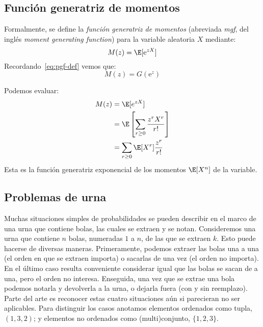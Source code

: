 \subsection{Función generatriz de momentos}
\label{sec:generatriz-momentos}

  Formalmente,
  se define la \emph{función generatriz de momentos}%
  (abreviada \emph{mgf},
   del inglés \emph{\foreignlanguage{english}{moment generating function}})
  para la variable aleatoria \(X\)
  mediante:
  \begin{equation}
    \label{eq:mgf-def}
    M(z)
      = \E[\mathrm{e}^{z X}]
  \end{equation}
  Recordando~\eqref{eq:pgf-def} vemos que:
  \begin{equation}
    \label{eq:mgf-pgf}
    M(z)
      = G(\mathrm{e}^z)
  \end{equation}

  Podemos evaluar:
  \begin{align}
    M(z)
      &= \E[e^{z X}] \notag \\
      &= \E\left[ \sum_{r \ge 0} \frac{z^r X^r}{r!} \right] \notag \\
      &= \sum_{r \ge 0} \E[X^r] \frac{z^r}{r!}
	   \label{eq:mgf-moments}
  \end{align}
  Esta es la función generatriz exponencial
  de los momentos \(\E[X^n]\) de la variable.

\subsection{Problemas de urna}
\label{sec:urn-problems}

  Muchas situaciones simples de probabilidades se pueden describir
  en el marco de una urna que contiene bolas,
  las cuales se extraen y se notan.
  Consideremos una urna que contiene \(n\) bolas,
  numeradas \(1\) a \(n\),
  de las que se extraen \(k\).
  Esto puede hacerse de diversas maneras.
  Primeramente,
  podemos extraer las bolas una a una
  (el orden en que se extraen importa)
  o sacarlas de una vez
  (el orden no importa).
  En el último caso
  resulta conveniente
  considerar igual que las bolas se sacan de a una,
  pero el orden no interesa.
  Enseguida,
  una vez que se extrae una bola podemos notarla
  y devolverla a la urna,
  o dejarla fuera
  (con y sin reemplazo).
  Parte del arte es reconocer estas cuatro situaciones
  aún si parecieran no ser aplicables.
  Para distinguir los casos
  anotamos elementos ordenados como tupla, \((1, 3, 2)\);
  y elementos no ordenados como (multi)conjunto, \(\{ 1, 2, 3 \}\).

